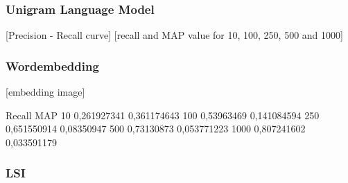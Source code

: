 \subsubsection{Unigram Language Model}
[Precision - Recall curve]
[recall and MAP value for 10, 100, 250, 500 and 1000]

\subsubsection{Wordembedding}
[embedding image]

	 Recall			MAP
10	 0,261927341	0,361174643
100  0,53963469		0,141084594
250  0,651550914	0,08350947
500  0,73130873		0,053771223
1000 0,807241602	0,033591179


\subsubsection{LSI}

